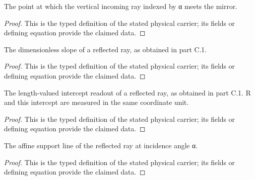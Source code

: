 \begin{definition}
  \label{def:physics:IPhO_2026_2_C_3:aux011}
  The point at which the vertical incoming ray indexed by α meets the mirror.
\end{definition}
\begin{proof}
  This is the typed definition of the stated physical carrier; its fields or defining equation provide the claimed data.
\end{proof}

\begin{definition}
  \label{def:physics:IPhO_2026_2_C_3:aux012}
  The dimensionless slope of a reflected ray, as obtained in part C.1.
\end{definition}
\begin{proof}
  This is the typed definition of the stated physical carrier; its fields or defining equation provide the claimed data.
\end{proof}

\begin{definition}
  \label{def:physics:IPhO_2026_2_C_3:aux013}
  The length-valued intercept readout of a reflected ray, as obtained in part C.1. R and this intercept are measured in the same coordinate unit.
\end{definition}
\begin{proof}
  This is the typed definition of the stated physical carrier; its fields or defining equation provide the claimed data.
\end{proof}

\begin{definition}
  \label{def:physics:IPhO_2026_2_C_3:aux014}
  The affine support line of the reflected ray at incidence angle α.
\end{definition}
\begin{proof}
  This is the typed definition of the stated physical carrier; its fields or defining equation provide the claimed data.
\end{proof}

